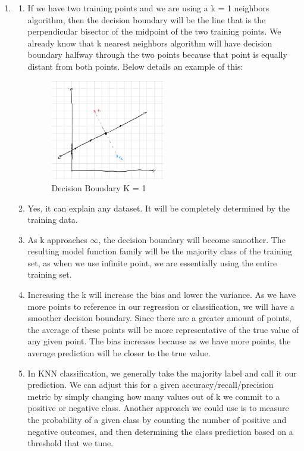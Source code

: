 \documentclass[12pt]{article}
\begin{document}
\begin{enumerate}
\item
\begin{enumerate}
\item If we have two training points and we are using a k = 1 neighbors algorithm, then the decision boundary will be the line that is the perpendicular bisector of the midpoint of the two training points. We already know that k nearest neighbors algorithm will have decision boundary halfway through the two points because that point is equally distant from both points. Below details an example of this: \\ 
\begin{figure}[H]
  \centering
  \includegraphics[width=0.5\textwidth]{2_a.jpeg}
  \caption{Decision Boundary K = 1}
  \label{fig:boundary}

\end{figure}
\item Yes, it can explain any dataset. It will be completely determined by the training data. 
\item As k approaches $\infty$, the decision boundary will become smoother. The resulting model function family will be the majority class of the training set, as when we use infinite point, we are essentially using the entire training set. 
\item Increasing the k will increase the bias and lower the variance. As we have more points to reference in our regression or classification, we will have a smoother decision boundary. Since there are a greater amount of points, the average of these points will be more representative of the true value of any given point. The bias increases because as we have more points, the average prediction will be closer to the true value. 
\item In KNN classification, we generally take the majority label and call it our prediction. We can adjust this for a given accuracy/recall/precision metric by simply changing how many values out of k we commit to a positive or negative class. Another approach we could use is to measure the probability of a given class by counting the number of positive and negative outcomes, and then determining the class prediction based on a threshold that we tune. 
\end{enumerate}


\end{enumerate}
\end{document}
